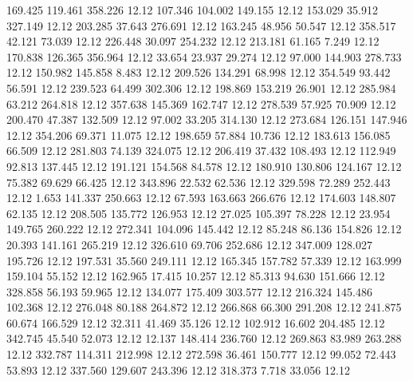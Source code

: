  169.425  119.461  358.226        12.12
 107.346  104.002  149.155        12.12
 153.029   35.912  327.149        12.12
 203.285   37.643  276.691        12.12
 163.245   48.956   50.547        12.12
 358.517   42.121   73.039        12.12
 226.448   30.097  254.232        12.12
 213.181   61.165    7.249        12.12
 170.838  126.365  356.964        12.12
  33.654   23.937   29.274        12.12
  97.000  144.903  278.733        12.12
 150.982  145.858    8.483        12.12
 209.526  134.291   68.998        12.12
 354.549   93.442   56.591        12.12
 239.523   64.499  302.306        12.12
 198.869  153.219   26.901        12.12
 285.984   63.212  264.818        12.12
 357.638  145.369  162.747        12.12
 278.539   57.925   70.909        12.12
 200.470   47.387  132.509        12.12
  97.002   33.205  314.130        12.12
 273.684  126.151  147.946        12.12
 354.206   69.371   11.075        12.12
 198.659   57.884   10.736        12.12
 183.613  156.085   66.509        12.12
 281.803   74.139  324.075        12.12
 206.419   37.432  108.493        12.12
 112.949   92.813  137.445        12.12
 191.121  154.568   84.578        12.12
 180.910  130.806  124.167        12.12
  75.382   69.629   66.425        12.12
 343.896   22.532   62.536        12.12
 329.598   72.289  252.443        12.12
   1.653  141.337  250.663        12.12
  67.593  163.663  266.676        12.12
 174.603  148.807   62.135        12.12
 208.505  135.772  126.953        12.12
  27.025  105.397   78.228        12.12
  23.954  149.765  260.222        12.12
 272.341  104.096  145.442        12.12
  85.248   86.136  154.826        12.12
  20.393  141.161  265.219        12.12
 326.610   69.706  252.686        12.12
 347.009  128.027  195.726        12.12
 197.531   35.560  249.111        12.12
 165.345  157.782   57.339        12.12
 163.999  159.104   55.152        12.12
 162.965   17.415   10.257        12.12
  85.313   94.630  151.666        12.12
 328.858   56.193   59.965        12.12
 134.077  175.409  303.577        12.12
 216.324  145.486  102.368        12.12
 276.048   80.188  264.872        12.12
 266.868   66.300  291.208        12.12
 241.875   60.674  166.529        12.12
  32.311   41.469   35.126        12.12
 102.912   16.602  204.485        12.12
 342.745   45.540   52.073        12.12
  12.137  148.414  236.760        12.12
 269.863   83.989  263.288        12.12
 332.787  114.311  212.998        12.12
 272.598   36.461  150.777        12.12
  99.052   72.443   53.893        12.12
 337.560  129.607  243.396        12.12
 318.373    7.718   33.056        12.12
